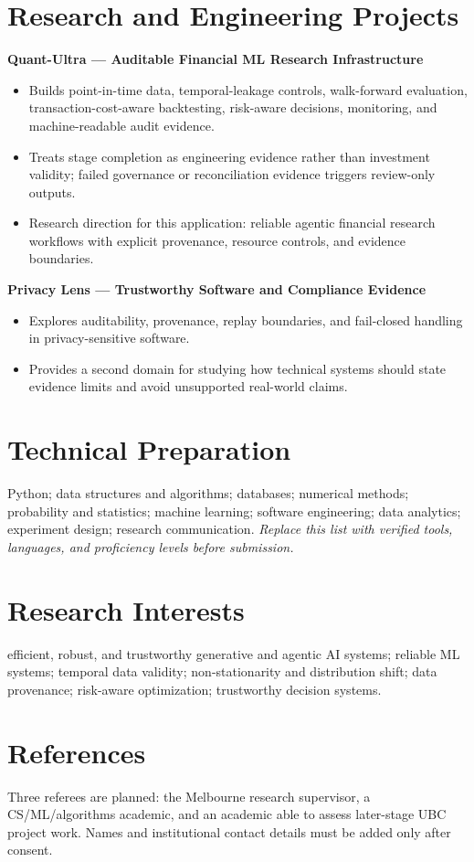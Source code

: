 \documentclass[11pt]{article}
\begin{document}
\section*{Research and Engineering Projects}
\textbf{Quant-Ultra --- Auditable Financial ML Research Infrastructure}
\begin{itemize}
\item Builds point-in-time data, temporal-leakage controls, walk-forward evaluation, transaction-cost-aware backtesting, risk-aware decisions, monitoring, and machine-readable audit evidence.
\item Treats stage completion as engineering evidence rather than investment validity; failed governance or reconciliation evidence triggers review-only outputs.
\item Research direction for this application: reliable agentic financial research workflows with explicit provenance, resource controls, and evidence boundaries.
\end{itemize}

\begin{samepage}
\textbf{Privacy Lens --- Trustworthy Software and Compliance Evidence}
\begin{itemize}
\item Explores auditability, provenance, replay boundaries, and fail-closed handling in privacy-sensitive software.
\item Provides a second domain for studying how technical systems should state evidence limits and avoid unsupported real-world claims.
\end{itemize}
\end{samepage}

\section*{Technical Preparation}
Python; data structures and algorithms; databases; numerical methods; probability and statistics; machine learning; software engineering; data analytics; experiment design; research communication. \textit{Replace this list with verified tools, languages, and proficiency levels before submission.}

\section*{Research Interests}
efficient, robust, and trustworthy generative and agentic AI systems; reliable ML systems; temporal data validity; non-stationarity and distribution shift; data provenance; risk-aware optimization; trustworthy decision systems.

\section*{References}
Three referees are planned: the Melbourne research supervisor, a CS/ML/algorithms academic, and an academic able to assess later-stage UBC project work. Names and institutional contact details must be added only after consent.
\end{document}

